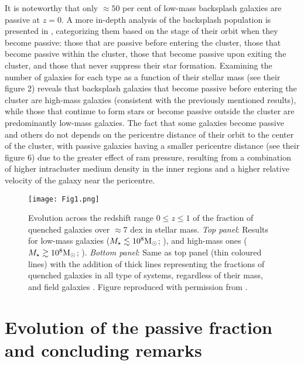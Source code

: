 \documentclass[baaa]{baaa}
\begin{document}
It is noteworthy that only $\approx 50$ per cent of low-mass backsplash galaxies are passive at $z=0$. A more in-depth analysis of the backsplash population is presented in \cite{Ruiz_2023}, categorizing them based on the stage of their orbit when they become passive: those that are passive before entering the cluster, those that become passive within the cluster, those that become passive upon exiting the cluster, and those that never suppress their star formation. Examining the number of galaxies for each type as a function of their stellar mass (see their figure 2) reveals that backsplash galaxies that become passive before entering the cluster are high-mass galaxies (consistent with the previously mentioned results), while those that continue to form stars or become passive outside the cluster are predominantly low-mass galaxies. The fact that some galaxies become passive and others do not depends on the pericentre distance of their orbit to the center of the cluster, with passive galaxies having a smaller pericentre distance (see their figure 6) due to the greater effect of ram pressure, resulting from a combination of higher intracluster medium density in the inner regions and a higher relative velocity of the galaxy near the pericentre.

\begin{figure}[!t]
\centering
\texttt{[image: Fig1.png]}
\caption{
Evolution across the redshift range $0\le z \le 1$ of the fraction of quenched galaxies over $\approx 7$ dex in stellar mass. \emph{Top panel}: Results for low-mass galaxies ($M_{\star} \lesssim 10^{8}{\rm M}_{\odot}$; \citealt{Weisz_2015}), and high-mass ones ($M_{\star} \gtrsim 10^{8}{\rm M}_{\odot}$; \citealt{Geha_2012, Wetzel_2013}). \emph{Bottom panel}: Same as top panel (thin coloured lines) with the addition of thick lines representing the fractions of quenched galaxies in all type of systems, regardless of their mass, and field galaxies \citep{Geha_2012, Karachentsev_2013}. Figure reproduced with permission from \cite{Weisz_2015}.
}
\label{Fig1}
\end{figure}


\section{Evolution of the passive fraction and concluding remarks}
\label{Sec:EvolPassiveFrac}
\end{document}

